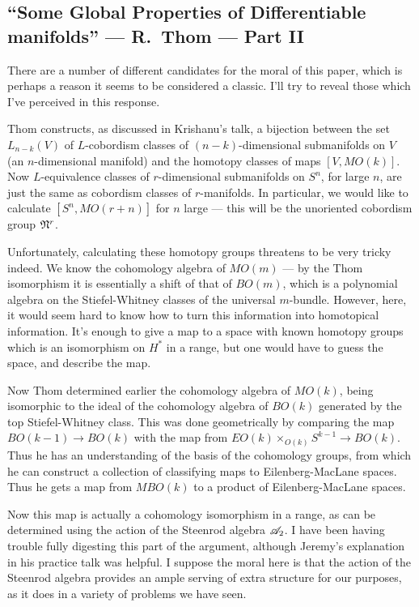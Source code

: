 \documentclass[11pt]{article}
\newcommand{\KanSemResponse}[1]
{
\thispagestyle{fancy}
\subsection*{#1}
}
\begin{document}
\begin{ThomGlobalPropertiesPartTwo}
\KanSemResponse
{``Some Global Properties of Differentiable manifolds'' --- R.\ Thom --- Part II}
There are a number of different candidates for the moral of this paper, which is perhaps a reason it seems to be considered a classic. I'll try to reveal those which I've perceived in this response.

Thom constructs, as discussed in Krishanu's talk, a bijection between the set $L_{n-k}(V)$ of $L$-cobordism classes of $(n-k)$-dimensional submanifolds on $V$ (an $n$-dimensional manifold) and the homotopy classes of maps $[V,MO(k)]$. Now $L$-equivalence classes of $r$-dimensional submanifolds on $S^n$, for large $n$, are just the same as cobordism classes of $r$-manifolds. In particular, we would like to calculate $[S^n,MO(r+n)]$ for $n$ large --- this will be the unoriented cobordism group $\mathfrak{N}^r$.

Unfortunately, calculating these homotopy groups threatens to be very tricky indeed. We know the cohomology algebra of $MO(m)$ --- by the Thom isomorphism it is essentially a shift of that of $BO(m)$, which is a polynomial algebra on the Stiefel-Whitney classes of the universal $m$-bundle. However, here, it would seem hard to know how to turn this information into homotopical information. It's enough to give a map to a space with known homotopy groups which is an isomorphism on $H^*$ in a range, but one would have to guess the space, and describe the map.

Now Thom determined earlier the cohomology algebra of $MO(k)$, being isomorphic to the ideal of the cohomology algebra of $BO(k)$ generated by the top Stiefel-Whitney class. This was done geometrically by comparing the map $BO(k-1)\to BO(k)$ with the map from $EO(k)\times_{O(k)}S^{k-1}\to BO(k)$. Thus he has an understanding of the basis of the cohomology groups, from which he can construct a collection of classifying maps to Eilenberg-MacLane spaces. Thus he gets a map from $MBO(k)$ to a product of Eilenberg-MacLane spaces. 

Now this map is actually a cohomology isomorphism in a range, as can be determined using the action of the Steenrod algebra $\mathscr{A}_2$. I have been having trouble fully digesting this part of the argument, although Jeremy's explanation in his practice talk was helpful. I suppose the moral here is that the action of the Steenrod algebra provides an ample serving of extra structure for our purposes, as it does in a variety of problems we have seen.


\end{ThomGlobalPropertiesPartTwo}
\end{document}
